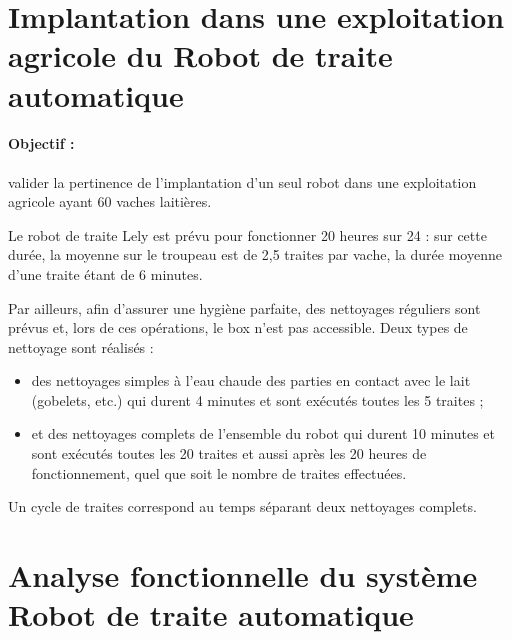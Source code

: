 \section{Implantation dans une exploitation agricole du \og Robot de traite automatique \fg}

\paragraph{Objectif :} valider la pertinence de l’implantation d’un seul robot dans une exploitation agricole ayant 60 vaches laitières.

Le robot de traite Lely est prévu pour fonctionner 20 heures sur 24 : sur cette durée, la moyenne sur le troupeau est de 2,5 traites par vache, la durée moyenne d’une traite étant de 6 minutes.

Par ailleurs, afin d’assurer une hygiène parfaite, des nettoyages réguliers sont prévus et, lors de ces opérations, le box n’est pas accessible. Deux types de nettoyage sont réalisés :
\begin{itemize}
 \item des nettoyages simples à l’eau chaude des parties en contact avec le lait (gobelets, etc.) qui durent 4 minutes et sont exécutés toutes les 5 traites ;
 \item et des nettoyages complets de l’ensemble du robot qui durent 10 minutes et sont exécutés toutes les 20 traites et aussi après les 20 heures de fonctionnement, quel que soit le nombre de traites effectuées.   
\end{itemize}

Un cycle de traites correspond au temps séparant deux nettoyages complets.






\section{Analyse fonctionnelle du système \og Robot de traite automatique \fg}

